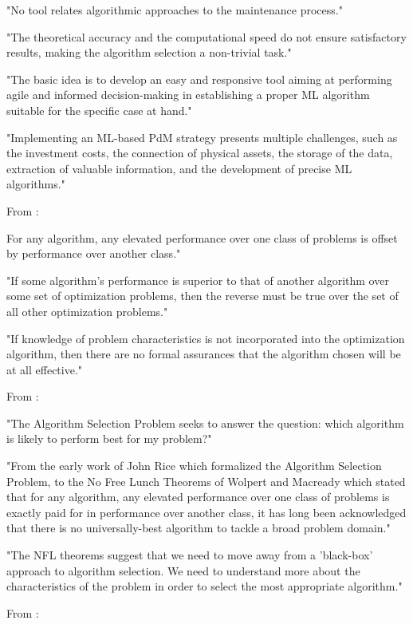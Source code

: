 "No tool relates algorithmic approaches to the maintenance process."

"The theoretical accuracy and the computational speed do not ensure satisfactory results, making the algorithm selection a non-trivial task."

"The basic idea is to develop an easy and responsive tool aiming at performing agile and informed decision-making in establishing a proper ML algorithm suitable for the specific case at hand."

"Implementing an ML-based PdM strategy presents multiple challenges, such as the investment costs, the connection of physical assets, the storage of the data, extraction of valuable information, and the development of precise ML algorithms."

From \parencite{wolpert1997no_free_lunch} :

For any algorithm, any elevated performance over one class of problems is offset by performance over another class."

"If some algorithm's performance is superior to that of another algorithm over some set of optimization problems, then the reverse must be true over the set of all other optimization problems."

"If knowledge of problem characteristics is not incorporated into the optimization algorithm, then there are no formal assurances that the algorithm chosen will be at all effective."

From \parencite{smith_miles2009algorithm_selection} :

"The Algorithm Selection Problem seeks to answer the question: which algorithm is likely to perform best for my problem?"

"From the early work of John Rice which formalized the Algorithm Selection Problem, to the No Free Lunch Theorems of Wolpert and Macready which stated that for any algorithm, any elevated performance over one class of problems is exactly paid for in performance over another class, it has long been acknowledged that there is no universally-best algorithm to tackle a broad problem domain."

"The NFL theorems suggest that we need to move away from a 'black-box' approach to algorithm selection. We need to understand more about the characteristics of the problem in order to select the most appropriate algorithm."

From \parencite{waring2020automated_machine_learning_review_state_of_the_art_opportunities_healthcare}:

